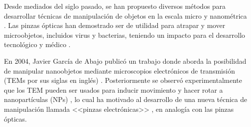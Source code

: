 
Desde mediados del siglo pasado, se han propuesto diversos métodos para desarrollar técnicas de manipulación de objetos en la escala micro y nanométrica \cite{ashkin1970acceleration, ashkin1987optical, Ashkin, custance2009atomic, dholakia2011shaping, marago2013optical, romo2020controlled}. Las pinzas ópticas han demostrado ser de utilidad para atrapar y mover microobjetos, incluidos virus y bacterias, teniendo un impacto para el desarrollo tecnológico y médico \cite{ashkin1970acceleration, ashkin1987optical, Ashkin}.  

En 2004, Javier García de Abajo publicó un trabajo donde aborda la posibilidad de manipular nanoobjetos mediante microscopios electrónicos de transmisión (TEMs por sus siglas en inglés) \cite{GarciadeAbajo0}. Posteriormente se observó experimentalmente que los TEM pueden ser usados para inducir movimiento y hacer rotar a nanopartículas (NPs) \cite{Batson01, zheng2012electron}, lo cual ha motivado al desarrollo de una nueva técnica de manipulación llamada <<pinzas electrónicas>> \cite{Batson, oleshko2005electron, Oleshko}, en analogía con las pinzas ópticas.